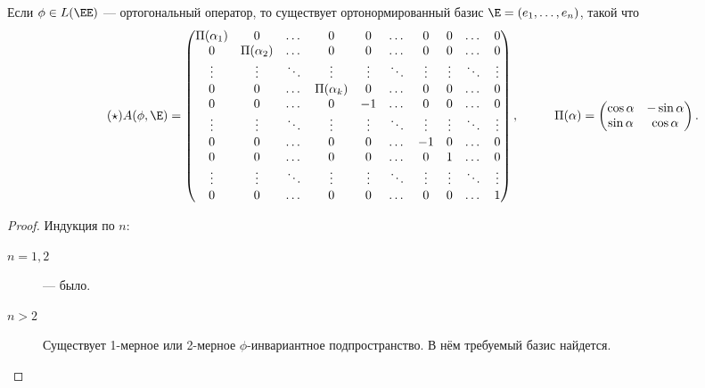 \documentclass[a4paper]{article}
\begin{document}
\begin{colloq}
            \begin{theorem}
                Если $\phi \in L(\EE)$ --- ортогональный оператор, то существует ортонормированный базис $\E = (e_1, \dots, e_n)$, такой что 
                \begin{equation*}
                    \label{lec30:zhopa}
                    \tag{$\star$}
                    A(\phi, \E) = \begin{pmatrix} 
                        \Pi(\alpha_1) & 0 & \dots & 0 & 0 & \dots & 0 & 0 & \dots & 0 \\ 
                        0 & \Pi(\alpha_2) & \dots & 0 & 0 & \dots & 0 & 0 & \dots & 0 \\
                        \vdots & \vdots & \ddots & \vdots & \vdots & \ddots & \vdots & \vdots & \ddots & \vdots \\
                        0 & 0 & \dots & \Pi(\alpha_k) & 0 & \dots & 0 & 0 & \dots & 0 \\
                        0 & 0 & \dots & 0 & -1 & \dots & 0& 0 & \dots & 0\\
                        \vdots & \vdots & \ddots & \vdots & \vdots & \ddots & \vdots & \vdots & \ddots & \vdots \\
                        0 & 0 & \dots & 0 & 0 & \dots & -1 & 0 & \dots & 0\\
                        0 & 0 & \dots & 0 & 0 & \dots & 0 & 1 & \dots & 0 \\
                        \vdots & \vdots & \ddots & \vdots & \vdots & \ddots & \vdots & \vdots & \ddots & \vdots \\
                        0 & 0 & \dots & 0 & 0 & \dots & 0 & 0 & \dots & 1
                    \end{pmatrix},
                    \hspace{1cm}
                    \Pi(\alpha) = \begin{pmatrix} \cos \alpha & -\sin \alpha \\ \sin \alpha & \cos \alpha \end{pmatrix}
                .\end{equation*}
            \end{theorem}

            \begin{proof}
                Индукция по $n$:
                \begin{description}
                \item[$n = 1, 2$]  --- было.
                \item[$n > 2$] Существует 1-мерное или 2-мерное $\phi$-инвариантное подпространство.
                    В нём требуемый базис найдется. 


\end{description}
\end{proof}
\end{colloq}
\end{document}
